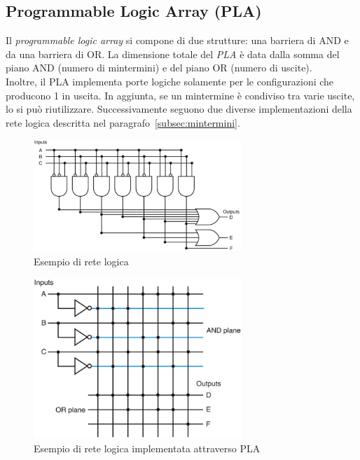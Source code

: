 \documentclass[class=book, crop=false]{standalone}
\begin{document}
\subsection{Programmable Logic Array (PLA)}
Il \emph{programmable logic array} si compone di due strutture: una barriera di AND e da una barriera di OR. La dimensione totale del \emph{PLA} è data dalla somma del piano AND (numero di mintermini) e del piano OR (numero di uscite).\\
Inoltre, il PLA implementa porte logiche solamente per le configurazioni che producono 1 in uscita. In aggiunta, se un mintermine è condiviso tra varie uscite, lo si può riutilizzare.
Successivamente seguono due diverse implementazioni della rete logica descritta nel paragrafo~\ref{subsec:mintermini}.
\begin{figure}[H]
	\centering
	\includegraphics[width=0.7\textwidth,keepaspectratio]{es_rete_logica.png}
	\caption{Esempio di rete logica}
\end{figure}
\begin{figure}[H]
	\centering
	\includegraphics[width=0.7\textwidth,keepaspectratio]{es_pla.png}
	\caption{Esempio di rete logica implementata attraverso PLA}
\end{figure}
\end{document}
